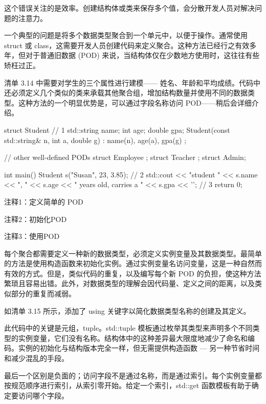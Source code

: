 这个错误关注的是效率。创建结构体或类来保存多个值，会分散开发人员对解决问题的注意力。


一个典型的问题是将多个数据类型聚合到一个单元中，以便于操作。通常使用 struct 或 class，这需要开发人员创建代码来定义聚合。这种方法已经行之有效多年，但对于普通旧数据 (POD) 来说，当结构体仅在少数地方使用时，这往往有些矫枉过正。

清单 3.14 中需要对学生的三个属性进行建模—— 姓名、年龄和平均成绩。代码中还必须定义几个类似的类来承载其他聚合组，增加结构数量并使用不同的数据类型。这种方法的一个明显优势是，可以通过字段名称访问 POD——稍后会详细介绍。


\begin{cpp}
struct Student { // 1
  std::string name;
  int age;
  double gpa;
  Student(const std::string& n, int a, double g) : name(n), age(a), gpa(g) {}
};

// other well-defined PODs
struct Employee {};
struct Teacher {};
struct Admin{};

int main() {
  Student s("Susan", 23, 3.85); // 2
  std::cout << "student " << s.name << ", " << s.age << " years old, carries a "
            << s.gpa << '\n'; // 3
  return 0;
}
\end{cpp}

{\footnotesize
注释1：定义简单的 POD

注释2：初始化POD

注释3：使用POD
}


每个聚合都需要定义一种新的数据类型，必须定义实例变量及其数据类型。最简单的方法是使用构造函数来初始化实例。通过实例变量名访问变量，这是一种自然而有效的方式。但是，类似代码的重复，以及编写每个新 POD 的负担，使这种方法繁琐且容易出错。此外，对数据类型的理解会因代码量、定义之间的距离，以及类似部分的重复而减弱。


如清单 3.15 所示，添加了 using 关键字以简化数据类型名称的创建及其定义。

此代码中的关键是元组，tuple。std::tuple 模板通过枚举其类型来声明多个不同类型的实例变量，它们没有名称。结构体中的这种差异最大限度地减少了命名和编码。实例的初始化与结构版本完全一样，但无需提供构造函数 — 另一种节省时间和减少混乱的手段。

最后一个区别是负面的；访问字段不是通过名称，而是通过索引。每个实例变量都按规范顺序进行索引，从索引零开始。给定一个索引，std::get 函数模板有助于确定要访问哪个字段。

